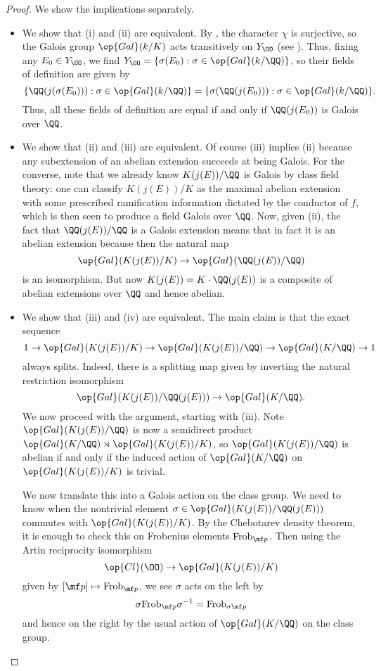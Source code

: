 \documentclass[../notes.tex]{subfiles}
\begin{document}
\begin{proof}
	We show the implications separately.
	\begin{itemize}
		\item We show that (i) and (ii) are equivalent. By , the character $\chi$ is surjective, so the Galois group $\op{Gal}(k/K)$ acts transitively on $Y_\OO$ (see ). Thus, fixing any $E_0\in Y_\OO$, we find $Y_\OO=\{\sigma(E_0):\sigma\in\op{Gal}(k/\QQ)\}$, so their fields of definition are given by
		\[\{\QQ(j(\sigma(E_0))):\sigma\in\op{Gal}(k/\QQ)\}=\{\sigma(\QQ(j(E_0))):\sigma\in\op{Gal}(k/\QQ)\}.\]
		Thus, all these fields of definition are equal if and only if $\QQ(j(E_0))$ is Galois over $\QQ$.

		\item We show that (ii) and (iii) are equivalent. Of course (iii) implies (ii) because any subextension of an abelian extension succeeds at being Galois. For the converse, note that we already know $K(j(E))/\QQ$ is Galois by class field theory: one can classify $K(j(E))/K$ as the maximal abelian extension with some prescribed ramification information dictated by the conductor of $f$, which is then seen to produce a field Galois over $\QQ$. Now, given (ii), the fact that $\QQ(j(E))/\QQ$ is a Galois extension means that in fact it is an abelian extension because then the natural map
		\[\op{Gal}(K(j(E))/K)\to\op{Gal}(\QQ(j(E))/\QQ)\]
		is an isomorphism. But now $K(j(E))=K\cdot\QQ(j(E))$ is a composite of abelian extensions over $\QQ$ and hence abelian.

		\item We show that (iii) and (iv) are equivalent. The main claim is that the exact sequence
		\[1\to\op{Gal}(K(j(E))/K)\to\op{Gal}(K(j(E))/\QQ)\to\op{Gal}(K/\QQ)\to1\]
		always splits. Indeed, there is a splitting map given by inverting the natural restriction isomorphism
		\[\op{Gal}(K(j(E))/\QQ(j(E)))\to\op{Gal}(K/\QQ).\]
		We now proceed with the argument, starting with (iii). Note $\op{Gal}(K(j(E))/\QQ)$ is now a semidirect product $\op{Gal}(K/\QQ)\rtimes\op{Gal}(K(j(E))/K)$, so $\op{Gal}(K(j(E))/\QQ)$ is abelian if and only if the induced action of $\op{Gal}(K/\QQ)$ on $\op{Gal}(K(j(E))/K)$ is trivial.
		
		We now translate this into a Galois action on the class group. We need to know when the nontrivial element $\sigma\in\op{Gal}(K(j(E))/\QQ(j(E)))$ commutes with $\op{Gal}(K(j(E))/K)$. By the Chebotarev density theorem, it is enough to check this on Frobenius elements $\mathrm{Frob}_{\mf p}$. Then using the Artin reciprocity isomorphism
		\[\op{Cl}(\OO)\to\op{Gal}(K(j(E))/K)\]
		given by $[\mf p]\mapsto\mathrm{Frob}_{\mf p}$, we see $\sigma$ acts on the left by
		\[\sigma\mathrm{Frob}_{\mf p}\sigma^{-1}=\mathrm{Frob}_{\sigma\mf p}\]
		and hence on the right by the usual action of $\op{Gal}(K/\QQ)$ on the class group.


\end{itemize}
\end{proof}
\end{document}
